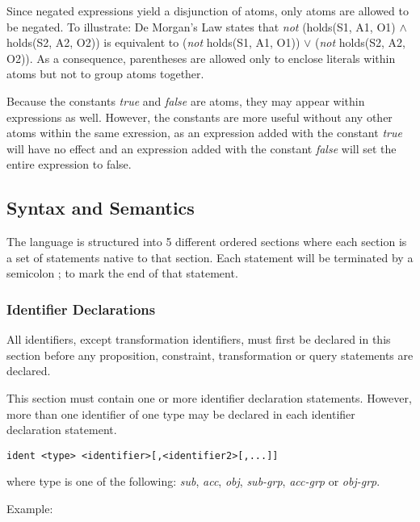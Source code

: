\documentclass[a4paper]{article}
\begin{document}
        Since negated expressions yield a disjunction of atoms, only
        atoms are allowed to be negated. To illustrate: De Morgan's Law
        states that \emph{not} (holds(S1, A1, O1) $\land$ holds(S2, A2, O2)) is
        equivalent to (\emph{not} holds(S1, A1, O1)) $\lor$ (\emph{not}
        holds(S2, A2, O2)). As a consequence, parentheses are allowed only
        to enclose literals within atoms but not to group atoms together. 

        Because the constants \emph{true} and \emph{false} are atoms, they may 
        appear within expressions as well. However, the constants are more
        useful without any other atoms within the same exression, as an
        expression added with the constant \emph{true} will have no effect
        and an expression added with the constant \emph{false} will set the
        entire expression to false.

    \subsection{Syntax and Semantics}

      The language is structured into 5 different ordered sections where each
      section is a set of statements native to that section.  Each statement
      will be terminated by a semicolon ; to mark the end of that statement.

      \subsubsection{Identifier Declarations}

        All identifiers, except transformation identifiers, must first be 
        declared in this section before any proposition, constraint, 
        transformation or query statements are declared.

        This section must contain one or more identifier declaration
        statements. However, more than one identifier of one type may be 
        declared in each identifier declaration statement.

\begin{verbatim}
ident <type> <identifier>[,<identifier2>[,...]]
\end{verbatim}

        where type is one of the following: \emph{sub}, \emph{acc}, \emph{obj},
        \emph{sub-grp}, \emph{acc-grp} or \emph{obj-grp}.

        Example:
\end{document}
